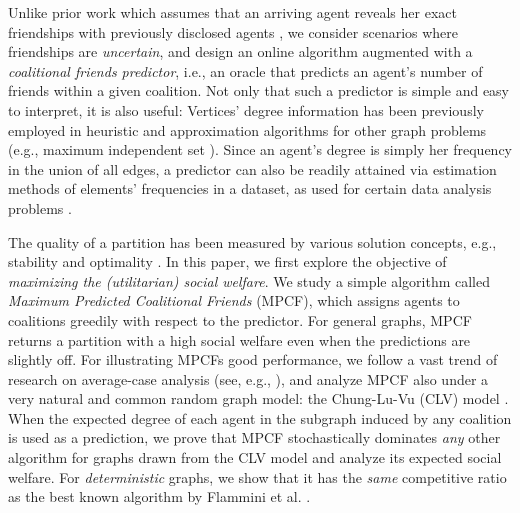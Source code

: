 \documentclass[letterpaper]{article}
\begin{document}
Unlike prior work which assumes that an arriving agent reveals her exact friendships with previously disclosed agents \cite{flammini2021online}, we consider scenarios where friendships are \textit{uncertain}, and design an online algorithm augmented with a \textit{coalitional friends predictor}, i.e., an oracle that predicts an agent's number of friends within a given coalition. Not only that such a predictor is simple and easy to interpret, it is also useful: Vertices' degree information has been previously employed in heuristic and approximation algorithms for other graph problems (e.g., maximum independent set \cite{halldorsson1994greed}). Since an agent's degree is simply her frequency in the union of all edges, a predictor can also be readily attained via estimation methods of elements' frequencies in a dataset, as used for certain data analysis problems \cite{hsu2019learning}.




The quality of a partition has been measured by various solution concepts, e.g., stability and optimality \cite{brandt2016introduction}. In this paper, we first explore the objective of \textit{maximizing the (utilitarian) social welfare}. We study a simple algorithm called \textit{Maximum Predicted Coalitional Friends} (MPCF), which assigns agents to coalitions greedily with respect to the predictor. For general graphs, MPCF returns a partition with a high social welfare even when the predictions are slightly off. For illustrating MPCFs good performance, we follow a vast trend of research on average-case analysis (see, e.g., \cite{karp1981maximum,meka2009matrix}), and analyze MPCF also under a very natural and common random graph model: the Chung-Lu-Vu (CLV) model \cite{chung2004spectra}. %
When the expected degree of each agent in the subgraph induced by any coalition is used as a prediction, we prove that MPCF stochastically dominates \textit{any} other algorithm for graphs drawn from the CLV model and analyze its expected social welfare. For \textit{deterministic} graphs, we show that it has the \textit{same} competitive ratio as the best known algorithm by Flammini et al. . %
\end{document}
